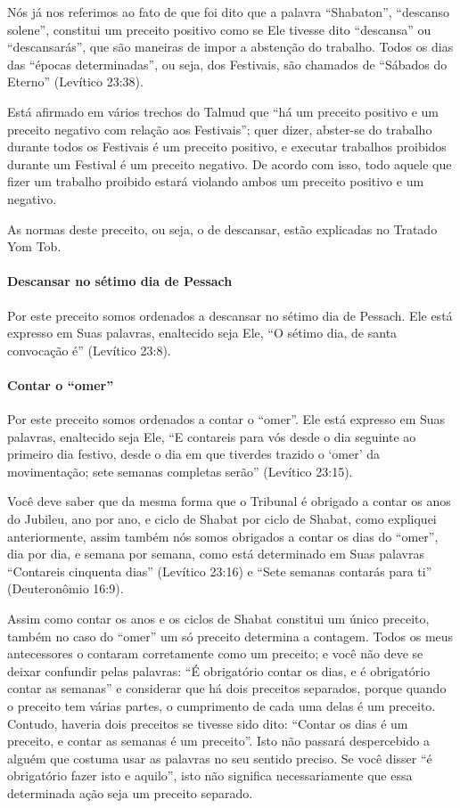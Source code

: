 Nós já nos referimos ao fato de que foi dito que a palavra
``Shabaton'', ``descanso solene'', constitui um preceito positivo como
se Ele tivesse dito ``descansa'' ou ``descansarás'', que são maneiras de
impor a abstenção do trabalho. Todos os dias das ``épocas
determinadas'', ou seja, dos Festivais, são chamados de ``Sábados do
Eterno'' (Levítico 23:38).

Está afirmado em vários trechos do Talmud que ``há um preceito positivo
e um preceito negativo com relação aos Festivais''; quer dizer,
abster-se do trabalho durante todos os Festivais é um preceito positivo,
e executar trabalhos proibidos durante um Festival é um preceito
negativo. De acordo com isso, todo aquele que fizer um trabalho
proibido estará violando ambos um preceito positivo e um negativo.

As normas deste preceito, ou seja, o de descansar, estão explicadas no
Tratado Yom Tob.

\paragraph{Descansar no sétimo dia de Pessach}

Por este preceito somos ordenados a descansar no sétimo dia de
Pessach. Ele está expresso em Suas palavras, enaltecido seja Ele,
``O sétimo dia, de santa convocação é'' (Levítico 23:8).

\paragraph{Contar o ``omer''}

Por este preceito somos ordenados a contar o ``omer''. Ele está
expresso em Suas palavras, enaltecido seja Ele, ``E contareis para vós
desde o dia seguinte ao primeiro dia festivo, desde o dia em que
tiverdes trazido o `omer' da movimentação; sete semanas completas
serão'' (Levítico 23:15).

Você deve saber que da mesma forma que o Tribunal é obrigado a contar os
anos do Jubileu, ano por ano, e ciclo de Shabat por ciclo de Shabat,
como expliquei anteriormente, assim também nós somos obrigados a contar
os dias do ``omer'', dia por dia, e semana por semana, como está
determinado em Suas palavras ``Contareis cinquenta dias'' (Levítico
23:16) e ``Sete semanas contarás para ti'' (Deuteronômio 16:9).

Assim como contar os anos e os ciclos de Shabat constitui um único
preceito, também no caso do ``omer'' um só preceito determina a
contagem. Todos os meus antecessores o contaram corretamente como um
preceito; e você não deve se deixar confundir pelas palavras: ``É
obrigatório contar os dias, e é obrigatório contar as semanas'' e
considerar que há dois preceitos separados, porque quando o preceito tem
várias partes, o cumprimento de cada uma delas é um preceito. Contudo,
haveria dois preceitos se tivesse sido dito: ``Contar os dias é um
preceito, e contar as semanas é um preceito''. Isto não passará
despercebido a alguém que costuma usar as palavras no seu sentido
preciso. Se você disser ``é obrigatório fazer isto e aquilo'', isto não
significa necessariamente que essa determinada ação seja um preceito
separado.

